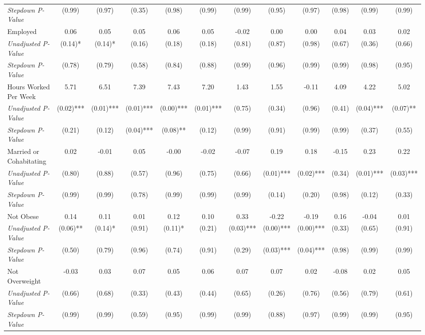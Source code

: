 \begin{tabular}{l c c c c c c c c c c c}
\quad \textit{Stepdown P-Value} & (0.99) & (0.97) & (0.35) & (0.98) & (0.99) & (0.99) & (0.95) & (0.97) & (0.98) & (0.99) & (0.99) \\
Employed & 0.06 & 0.05 & 0.05 & 0.06 & 0.05 & -0.02 & 0.00 & 0.00 & 0.04 & 0.03 & 0.02 \\
\quad \textit{Unadjusted P-Value} & (0.14)* & (0.14)* & (0.16) & (0.18) & (0.18) & (0.81) & (0.87) & (0.98) & (0.67) & (0.36) & (0.66) \\
\quad \textit{Stepdown P-Value} & (0.78) & (0.79) & (0.58) & (0.84) & (0.88) & (0.99) & (0.96) & (0.99) & (0.99) & (0.98) & (0.95) \\
Hours Worked Per Week & 5.71 & 6.51 & 7.39 & 7.43 & 7.20 & 1.43 & 1.55 & -0.11 & 4.09 & 4.22 & 5.02 \\
\quad \textit{Unadjusted P-Value} & (0.02)*** & (0.01)*** & (0.01)*** & (0.00)*** & (0.01)*** & (0.75) & (0.34) & (0.96) & (0.41) & (0.04)*** & (0.07)** \\
\quad \textit{Stepdown P-Value} & (0.21) & (0.12) & (0.04)*** & (0.08)** & (0.12) & (0.99) & (0.91) & (0.99) & (0.99) & (0.37) & (0.55) \\
Married or Cohabitating & 0.02 & -0.01 & 0.05 & -0.00 & -0.02 & -0.07 & 0.19 & 0.18 & -0.15 & 0.23 & 0.22 \\
\quad \textit{Unadjusted P-Value} & (0.80) & (0.88) & (0.57) & (0.96) & (0.75) & (0.66) & (0.01)*** & (0.02)*** & (0.34) & (0.01)*** & (0.03)*** \\
\quad \textit{Stepdown P-Value} & (0.99) & (0.99) & (0.78) & (0.99) & (0.99) & (0.99) & (0.14) & (0.20) & (0.98) & (0.12) & (0.33) \\
Not Obese & 0.14 & 0.11 & 0.01 & 0.12 & 0.10 & 0.33 & -0.22 & -0.19 & 0.16 & -0.04 & 0.01 \\
\quad \textit{Unadjusted P-Value} & (0.06)** & (0.14)* & (0.91) & (0.11)* & (0.21) & (0.03)*** & (0.00)*** & (0.00)*** & (0.33) & (0.65) & (0.91) \\
\quad \textit{Stepdown P-Value} & (0.50) & (0.79) & (0.96) & (0.74) & (0.91) & (0.29) & (0.03)*** & (0.04)*** & (0.98) & (0.99) & (0.99) \\
Not Overweight & -0.03 & 0.03 & 0.07 & 0.05 & 0.06 & 0.07 & 0.07 & 0.02 & -0.08 & 0.02 & 0.05 \\
\quad \textit{Unadjusted P-Value} & (0.66) & (0.68) & (0.33) & (0.43) & (0.44) & (0.65) & (0.26) & (0.76) & (0.56) & (0.79) & (0.61) \\
\quad \textit{Stepdown P-Value} & (0.99) & (0.99) & (0.59) & (0.95) & (0.99) & (0.99) & (0.88) & (0.97) & (0.99) & (0.99) & (0.95) \\

\end{tabular}

